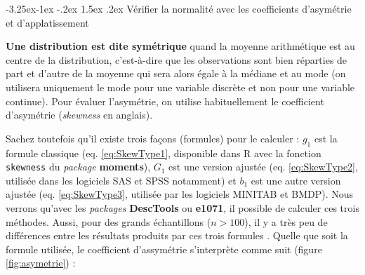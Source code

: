 \documentclass[
  11pt,
  french,
]{book}
\makeatletter
\renewcommand\paragraph{\@startsection{paragraph}{4}{\z@}%
   {-3.25ex\@plus -1ex \@minus -.2ex}%
   {1.5ex \@plus .2ex}%
   {\normalfont\normalsize\bfseries}}
\makeatother
\begin{document}
\hypertarget{vuxe9rifier-la-normalituxe9-avec-les-coefficients-dasymuxe9trie-et-dapplatissement}{%
\paragraph{Vérifier la normalité avec les coefficients d'asymétrie et d'applatissement}\label{vuxe9rifier-la-normalituxe9-avec-les-coefficients-dasymuxe9trie-et-dapplatissement}}

\textbf{Une distribution est dite symétrique} quand la moyenne arithmétique est au centre de la distribution, c'est-à-dire que les observations sont bien réparties de part et d'autre de la moyenne qui sera alors égale à la médiane et au mode (on utilisera uniquement le mode pour une variable discrète et non pour une variable continue). Pour évaluer l'asymétrie, on utilise habituellement le coefficient d'asymétrie (\emph{skewness} en anglais).

Sachez toutefois qu'il existe trois façons (formules) pour le calculer \citep{joanes1998comparing} : \(g_1\) est la formule classique (eq. \eqref{eq:SkewType1}, disponible dans R avec la fonction \texttt{skewness} du \emph{package} \textbf{moments}), \(G_1\) est une version ajustée (eq. \eqref{eq:SkewType2}, utilisée dans les logiciels SAS et SPSS notamment) et \(b_1\) est une autre version ajustée (eq. \eqref{eq:SkewType3}, utilisée par les logiciels MINITAB et BMDP). Nous verrons qu'avec les \emph{packages} \textbf{DescTools} ou \textbf{e1071}, il possible de calculer ces trois méthodes. Aussi, pour des grands échantillons (\(n>100\)), il y a très peu de différences entre les résultats produits par ces trois formules \citep{joanes1998comparing}. Quelle que soit la formule utilisée, le coefficient d'assymétrie s'interprète comme suit (figure \ref{fig:asymetrie}) :
\end{document}
